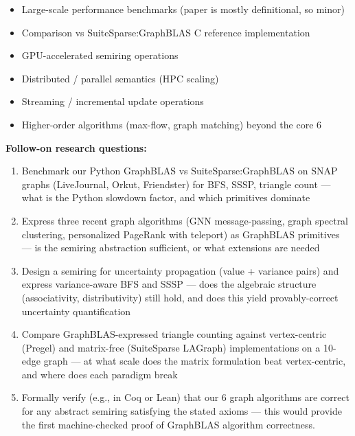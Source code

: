 \documentclass[11pt]{article}
\begin{document}
\begin{itemize}[leftmargin=1.4em,itemsep=0.2em,topsep=0.2em]
\item Large-scale performance benchmarks (paper is mostly definitional, so minor)
\item Comparison vs SuiteSparse:GraphBLAS C reference implementation
\item GPU-accelerated semiring operations
\item Distributed / parallel semantics (HPC scaling)
\item Streaming / incremental update operations
\item Higher-order algorithms (max-flow, graph matching) beyond the core 6
\end{itemize}\noindent\textbf{Follow-on research questions:}
\begin{enumerate}[leftmargin=1.6em,itemsep=0.2em,topsep=0.2em,label=Q\arabic*.]
\item Benchmark our Python GraphBLAS vs SuiteSparse:GraphBLAS on SNAP graphs (LiveJournal, Orkut, Friendster) for BFS, SSSP, triangle count --- what is the Python slowdown factor, and which primitives dominate
\item Express three recent graph algorithms (GNN message-passing, graph spectral clustering, personalized PageRank with teleport) as GraphBLAS primitives --- is the semiring abstraction sufficient, or what extensions are needed
\item Design a semiring for uncertainty propagation (value + variance pairs) and express variance-aware BFS and SSSP --- does the algebraic structure (associativity, distributivity) still hold, and does this yield provably-correct uncertainty quantification
\item Compare GraphBLAS-expressed triangle counting against vertex-centric (Pregel) and matrix-free (SuiteSparse LAGraph) implementations on a 10-edge graph --- at what scale does the matrix formulation beat vertex-centric, and where does each paradigm break
\item Formally verify (e.g., in Coq or Lean) that our 6 graph algorithms are correct for any abstract semiring satisfying the stated axioms --- this would provide the first machine-checked proof of GraphBLAS algorithm correctness.
\end{enumerate}
\end{document}
